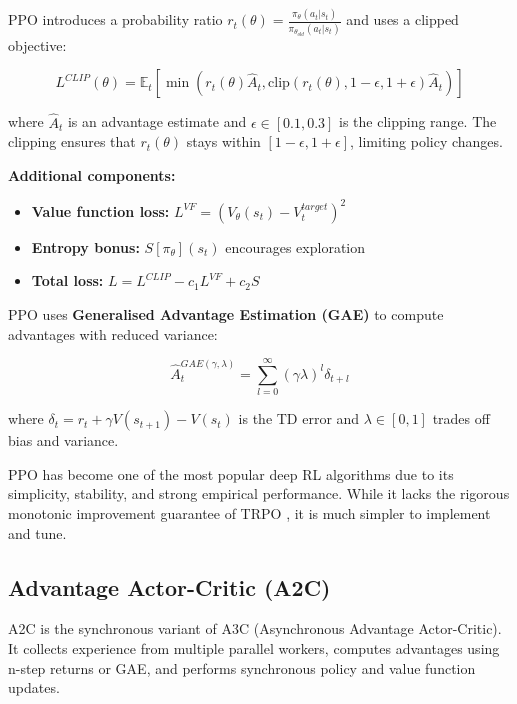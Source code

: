 \documentclass[12pt,a4paper]{report}
\begin{document}
PPO introduces a probability ratio $r_t(\theta) = \frac{\pi_\theta(a_t|s_t)}{\pi_{\theta_{old}}(a_t|s_t)}$ and uses a clipped objective:

\begin{equation}
L^{CLIP}(\theta) = \mathbb{E}_t \left[ \min\left(r_t(\theta) \hat{A}_t, \text{clip}(r_t(\theta), 1-\epsilon, 1+\epsilon) \hat{A}_t\right) \right]
\end{equation}

where $\hat{A}_t$ is an advantage estimate and $\epsilon \in [0.1, 0.3]$ is the clipping range. The clipping ensures that $r_t(\theta)$ stays within $[1-\epsilon, 1+\epsilon]$, limiting policy changes.

\textbf{Additional components:}
\begin{itemize}
    \item \textbf{Value function loss:} $L^{VF} = (V_\theta(s_t) - V^{target}_t)^2$
    \item \textbf{Entropy bonus:} $S[\pi_\theta](s_t)$ encourages exploration
    \item \textbf{Total loss:} $L = L^{CLIP} - c_1 L^{VF} + c_2 S$
\end{itemize}

PPO uses \textbf{Generalised Advantage Estimation (GAE)} \cite{schulman2015gae} to compute advantages with reduced variance:

\begin{equation}
\hat{A}_t^{GAE(\gamma,\lambda)} = \sum_{l=0}^{\infty} (\gamma\lambda)^l \delta_{t+l}
\end{equation}

where $\delta_t = r_t + \gamma V(s_{t+1}) - V(s_t)$ is the TD error and $\lambda \in [0,1]$ trades off bias and variance.

PPO has become one of the most popular deep RL algorithms due to its simplicity, stability, and strong empirical performance. While it lacks the rigorous monotonic improvement guarantee of TRPO \cite{schulman2017trpo}, it is much simpler to implement and tune.

\subsection{Advantage Actor-Critic (A2C)}

A2C \cite{mnih2016a3c} is the synchronous variant of A3C (Asynchronous Advantage Actor-Critic). It collects experience from multiple parallel workers, computes advantages using n-step returns or GAE, and performs synchronous policy and value function updates.
\end{document}
